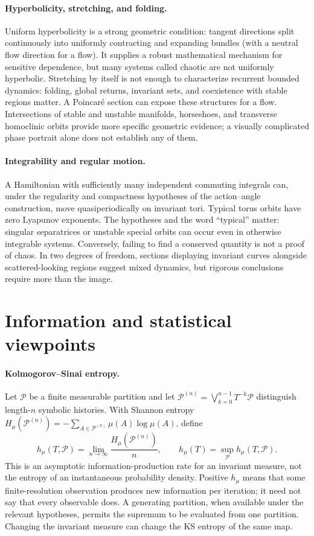 \documentclass[11pt,a4paper]{article}
\begin{document}
\paragraph{Hyperbolicity, stretching, and folding.} Uniform hyperbolicity is a strong geometric condition: tangent directions split continuously into uniformly contracting and expanding bundles (with a neutral flow direction for a flow). It supplies a robust mathematical mechanism for sensitive dependence, but many systems called chaotic are not uniformly hyperbolic. Stretching by itself is not enough to characterize recurrent bounded dynamics: folding, global returns, invariant sets, and coexistence with stable regions matter. A Poincar\'e section can expose these structures for a flow. Intersections of stable and unstable manifolds, horseshoes, and transverse homoclinic orbits provide more specific geometric evidence; a visually complicated phase portrait alone does not establish any of them.

\paragraph{Integrability and regular motion.} A Hamiltonian with sufficiently many independent commuting integrals can, under the regularity and compactness hypotheses of the action--angle construction, move quasiperiodically on invariant tori. Typical torus orbits have zero Lyapunov exponents. The hypotheses and the word ``typical'' matter: singular separatrices or unstable special orbits can occur even in otherwise integrable systems. Conversely, failing to find a conserved quantity is not a proof of chaos. In two degrees of freedom, sections displaying invariant curves alongside scattered-looking regions suggest mixed dynamics, but rigorous conclusions require more than the image.

\section*{Information and statistical viewpoints}
\paragraph{Kolmogorov--Sinai entropy.} Let $\mathcal P$ be a finite measurable partition and let $\mathcal P^{(n)}=\bigvee_{k=0}^{n-1}T^{-k}\mathcal P$ distinguish length-$n$ symbolic histories. With Shannon entropy $H_\mu(\mathcal P^{(n)})=-\sum_{A\in\mathcal P^{(n)}}\mu(A)\log\mu(A)$, define
\[h_\mu(T,\mathcal P)=\lim_{n\to\infty}\frac{H_\mu(\mathcal P^{(n)})}{n},\qquad h_\mu(T)=\sup_{\mathcal P}h_\mu(T,\mathcal P).\]
This is an asymptotic information-production rate for an invariant measure, not the entropy of an instantaneous probability density. Positive $h_\mu$ means that some finite-resolution observation produces new information per iteration; it need not say that every observable does. A generating partition, when available under the relevant hypotheses, permits the supremum to be evaluated from one partition. Changing the invariant measure can change the KS entropy of the same map.
\end{document}
